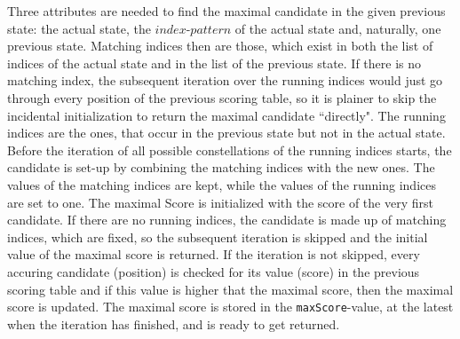 \documentclass[a4paper,10pt]{thesis}
\newcommand{\iP}{$index\texttt{-}pattern$}
\begin{document}
{{{{        \gapSmall
        Three attributes are needed to find the maximal candidate in the given previous state: the actual state, the \iP{} of the actual state and, naturally, one previous state. Matching indices then are those, which exist in both the list of indices of the actual state and in the list of the previous state. If there is no matching index, the subsequent iteration over the running indices would just go through every position of the previous scoring table, so it is plainer to skip the incidental initialization to return the maximal candidate ``directly". The running indices are the ones, that occur in the previous state but not in the actual state.
        \gapSmall
        Before the iteration of all possible constellations of the running indices starts, the candidate is set-up by combining the matching indices with the new ones. The values of the matching indices are kept, while the values of the running indices are set to one. The maximal Score is initialized with the score of the very first candidate. If there are no running indices, the candidate is made up of matching indices, which are fixed, so the subsequent iteration is skipped and the initial value of the maximal score is returned. If the iteration is not skipped, every accuring candidate (position) is checked for its value (score) in the previous scoring table and if this value is higher that the maximal score, then the maximal score is updated. The maximal score is stored in the \texttt{maxScore}-value, at the latest when the iteration has finished, and is ready to get returned.
        }}}}
\end{document}
